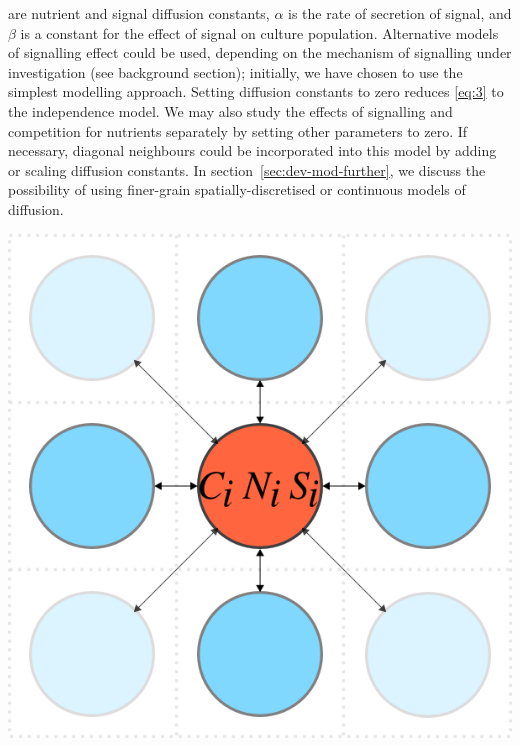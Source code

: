 are nutrient and signal diffusion constants, \(\alpha\) is the rate of
secretion of signal, and \(\beta\) is a constant for the effect of
signal on culture population. Alternative models of signalling effect
could be used, depending on the mechanism of signalling under
investigation (see background section); initially, we have chosen to
use the simplest modelling approach. Setting diffusion constants to
zero reduces \ref{eq:3} to the independence model. We may also study
the effects of signalling and competition for nutrients separately by
setting other parameters to zero. If necessary, diagonal neighbours
could be incorporated into this model by adding or scaling diffusion
constants. In section~\ref{sec:dev-mod-further}, we discuss the
possibility of using finer-grain spatially-discretised or continuous
models of diffusion.

\begin{Figure}
  \centering
  \includegraphics[width=\linewidth]{square_array}
  \label{fig:simple_model}
\end{Figure}


